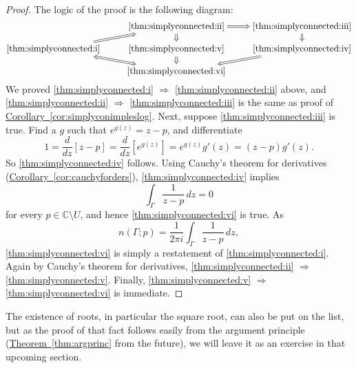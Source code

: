 \documentclass[12pt,openany]{book}
\newcommand{\C}{{\mathbb{C}}}
\theoremstyle{plain}
\theoremstyle{remark}
\theoremstyle{definition}
\theoremstyle{exercise}
\theoremstyle{example}
\newcommand{\thmref}[1]{\hyperref[#1]{Theorem~\ref*{#1}}}
\newcommand{\corref}[1]{\hyperref[#1]{Corollary~\ref*{#1}}}
\begin{document}
\begin{proof}
The logic of the proof is the following diagram:
\begin{equation*}
\begin{tikzcd}[cramped, row sep=small]
& \text{\ref{thm:simplyconnected:ii}} \arrow[d, Rightarrow] \arrow[r, Rightarrow] &
\text{\ref{thm:simplyconnected:iii}} \arrow[d, Rightarrow] \\
\text{\ref{thm:simplyconnected:i}} \arrow[ur, Rightarrow] & 
\text{\ref{thm:simplyconnected:v}} \arrow[d, Rightarrow] &
\text{\ref{thm:simplyconnected:iv}} \arrow[dl, Rightarrow] \\
& \text{\ref{thm:simplyconnected:vi}} \arrow[ul, Leftrightarrow] &
\end{tikzcd}
\end{equation*}
We proved
\ref{thm:simplyconnected:i} $\Rightarrow$
\ref{thm:simplyconnected:ii} above,
and
\ref{thm:simplyconnected:ii} $\Rightarrow$
\ref{thm:simplyconnected:iii}
is the same as proof of \corref{cor:simplyconimpleslog}.
Next, suppose \ref{thm:simplyconnected:iii} is true.  Find a $g$ such that
$e^{g(z)} = z-p$, and differentiate
\begin{equation*}
1 = 
\frac{d}{dz} \left[
z-p
\right]
=
\frac{d}{dz} \left[
e^{g(z)}
\right]
=
e^{g(z)} g'(z)
=
(z-p) g'(z) .
\end{equation*}
So \ref{thm:simplyconnected:iv} follows.
Using Cauchy's theorem for derivatives (\corref{cor:cauchyforders}),
\ref{thm:simplyconnected:iv} implies
\begin{equation*}
\int_\Gamma \frac{1}{z-p} \, dz = 0 
\end{equation*}
for every $p \in \C \setminus U$,
and hence 
\ref{thm:simplyconnected:vi} is true.
As 
\begin{equation*}
n(\Gamma;p) = 
\frac{1}{2\pi i}
\int_\Gamma \frac{1}{z-p} \, dz ,
\end{equation*}
\ref{thm:simplyconnected:vi} is simply a restatement of
\ref{thm:simplyconnected:i}.
Again by Cauchy's theorem for derivatives,
\ref{thm:simplyconnected:ii} $\Rightarrow$
\ref{thm:simplyconnected:v}.
Finally, \ref{thm:simplyconnected:v} $\Rightarrow$
\ref{thm:simplyconnected:vi} is immediate.
\end{proof}

The existence of roots, in particular the square root, can also be put on
the list, but as the proof of that fact follows easily from the argument principle
(\thmref{thm:argprinc} from the future),
we will leave it as an exercise in that upcoming section.
\end{document}
